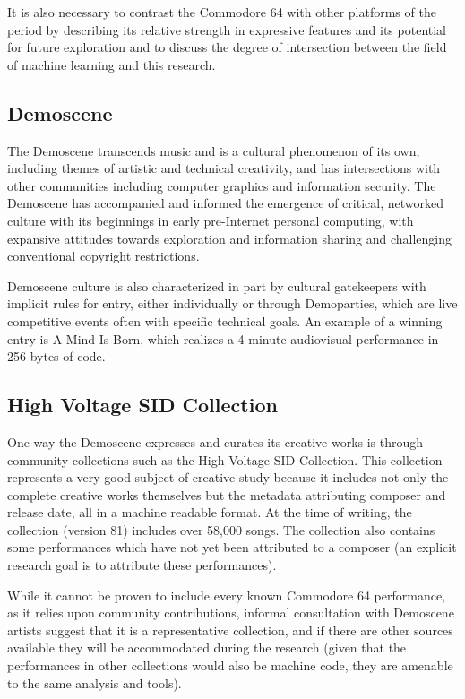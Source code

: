 \documentclass[10pt]{article}
\begin{document}
\begin{multicols*}{2}
It is also necessary to contrast the Commodore 64 with other platforms of the period by describing its relative strength in expressive features and its potential for future exploration and to discuss the degree of intersection between the field of machine learning and this research.

\subsection{Demoscene}

The Demoscene transcends music and is a cultural phenomenon of its own\cite{hackingpractices}, including themes of artistic and technical creativity, and has intersections with other communities including computer graphics\cite{siggraphdemo} and information security\cite{layerone}. The Demoscene has accompanied and informed the emergence of critical, networked culture with its beginnings in early pre-Internet personal computing\cite{pioneers}, with expansive attitudes towards exploration and information sharing and challenging conventional copyright restrictions.

Demoscene culture is also characterized in part by cultural gatekeepers with implicit rules for entry\cite{gatekeepers}, either individually or through Demoparties\cite{assembly}, which are live competitive events often with specific technical goals. An example of a winning entry is A Mind Is Born\cite{amib}, which realizes a 4 minute audiovisual performance in 256 bytes of code.

\subsection{High Voltage SID Collection}
\label{hvsc}

One way the Demoscene expresses and curates its creative works is through community collections such as the High Voltage SID Collection\cite{hvsc}. This collection represents a very good subject of creative study because it includes not only the complete creative works themselves but the metadata attributing composer and release date, all in a machine readable format. At the time of writing, the collection (version 81) includes over 58,000 songs. The collection also contains some performances which have not yet been attributed to a composer (an explicit research goal is to attribute these performances).

While it cannot be proven to include every known Commodore 64 performance, as it relies upon community contributions, informal consultation with Demoscene artists suggest that it is a representative collection, and if there are other sources available they will be accommodated during the research (given that the performances in other collections would also be machine code, they are amenable to the same analysis and tools).


\end{multicols*}
\end{document}
